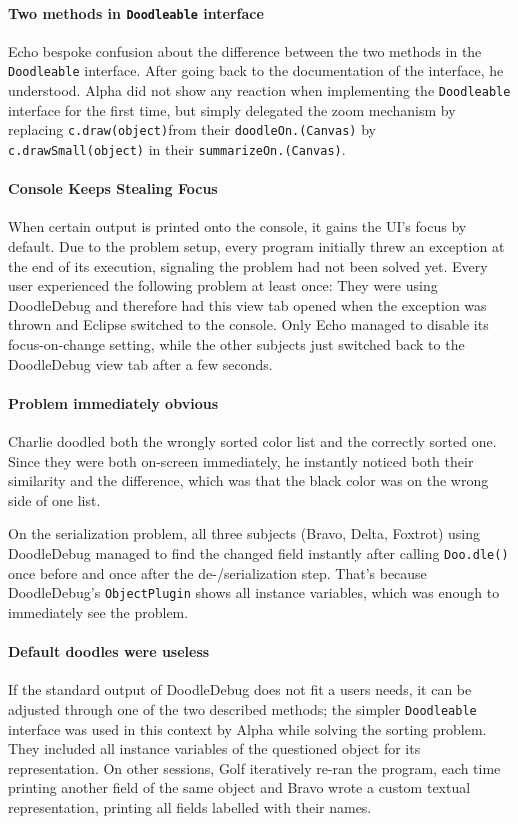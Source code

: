 \documentclass[english]{scrartcl}
\begin{document}
\paragraph{Two methods in \texttt{Doodleable} interface}
Echo bespoke confusion about the difference between the two methods in the \texttt{Doodleable} interface. After going back to the documentation of the interface, he understood.
Alpha did not show any reaction when implementing the \texttt{Doodleable} interface for the first time, but simply delegated the zoom mechanism by replacing \texttt{c.draw(object)}from their \texttt{doodleOn.(Canvas)} 
by \texttt{c.drawSmall(object)} in their \texttt{summarizeOn.(Canvas)}.

\paragraph{Console Keeps Stealing Focus}
When certain output is printed onto the console, it gains the UI's focus by default.
Due to the problem setup, every program initially threw an exception at the end of its execution, signaling the problem had not been solved yet.
Every user experienced the following problem at least once: They were using DoodleDebug and therefore had this view tab opened when the exception was thrown and Eclipse switched to the console.
Only Echo managed to disable its focus-on-change setting, while the other subjects just switched back to the DoodleDebug view tab after a few seconds.

\paragraph{Problem immediately obvious}
Charlie doodled both the wrongly sorted color list and the correctly sorted one. Since they were both on-screen immediately, he instantly noticed both their similarity and the difference, which was that the black color was on the wrong side of one list.

On the serialization problem, all three subjects (Bravo, Delta, Foxtrot) using DoodleDebug managed to find the changed field instantly after calling \texttt{Doo.dle()} once before and once after the de-/serialization step. That's because DoodleDebug's \texttt{ObjectPlugin} shows all instance variables, which was enough to immediately see the problem.

\paragraph{Default doodles were useless}
If the standard output of DoodleDebug does not fit a users needs, it can be adjusted through one of the two described methods; the simpler \texttt{Doodleable} interface was used in this context by Alpha while solving the sorting problem.
They included all instance variables of the questioned object for its representation.
On other sessions, Golf iteratively re-ran the program, each time printing another field of the same object and Bravo wrote a custom textual representation, printing all fields labelled with their names.
\end{document}

